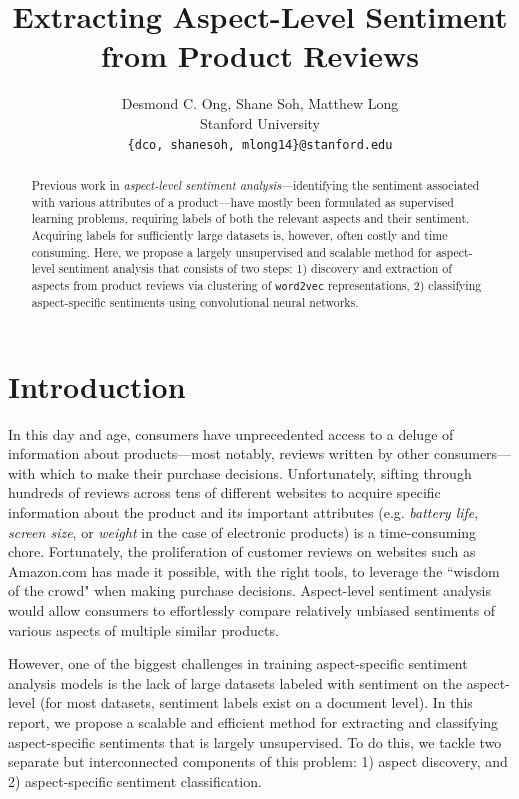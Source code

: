 \documentclass{article} %
\title{  Extracting Aspect-Level Sentiment from Product Reviews  }
\author{
Desmond C. Ong, Shane Soh, Matthew Long \\
Stanford University \\
\texttt{\{dco, shanesoh, mlong14\}@stanford.edu}
}
\begin{document}
\maketitle

\begin{abstract}
Previous work in \textit{aspect-level sentiment analysis}---identifying the sentiment associated with various attributes of a product---have mostly been formulated as supervised learning problems, requiring labels of both the relevant aspects and their sentiment. Acquiring labels for sufficiently large datasets is, however, often costly and time consuming. Here, we propose a largely unsupervised and scalable method for aspect-level sentiment analysis that consists of two steps: 1) discovery and extraction of aspects from product reviews via clustering of \texttt{word2vec} representations, 2) classifying aspect-specific sentiments using convolutional neural networks.
\end{abstract}

\section{Introduction}


In this day and age, consumers have unprecedented access to a deluge of information about products---most notably, reviews written by other consumers---with which to make their purchase decisions. Unfortunately, sifting through hundreds of reviews across tens of different websites to acquire specific information about the product and its important attributes (e.g. \textit{battery life}, \textit{screen size}, or \textit{weight} in the case of electronic products) is a time-consuming chore. Fortunately, the proliferation of customer reviews on websites such as Amazon.com has made it possible, with the right tools, to leverage the ``wisdom of the crowd" when making purchase decisions. Aspect-level sentiment analysis would allow consumers to effortlessly compare relatively unbiased sentiments of various aspects of multiple similar products.

However, one of the biggest challenges in training aspect-specific sentiment analysis models is the lack of large datasets labeled with sentiment on the aspect-level (for most datasets, sentiment labels exist on a document level). In this report, we propose a scalable and efficient method for extracting and classifying aspect-specific sentiments that is largely unsupervised. To do this, we tackle two separate but interconnected components of this problem: 1) aspect discovery, and 2) aspect-specific sentiment classification.
\end{document}
